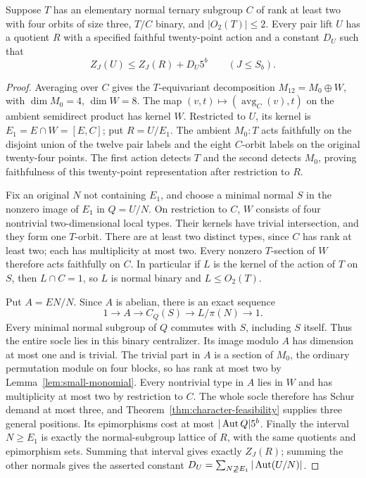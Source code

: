 \begin{lemma}\label{lem:four-triple-compression}
Suppose $T$ has an elementary normal ternary subgroup $C$ of rank at
least two with four orbits of size three, $T/C$ binary, and
$|O_2(T)|\leq2$. Every pair lift $U$ has a quotient $R$ with a
specified faithful twenty-point action and a constant $D_U$ such that
\[
 Z_J(U)\leq Z_J(R)+D_U5^b\qquad(J\leq S_b).
\]
\end{lemma}
\begin{proof}
Averaging over $C$ gives the $T$-equivariant decomposition
$M_{12}=M_0\oplus W$, with $\dim M_0=4$, $\dim W=8$.
The map $(v,t)\mapsto(\operatorname{avg}_C(v),t)$ on the ambient
semidirect product has kernel $W$. Restricted to $U$, its kernel is
$E_1=E\cap W=[E,C]$; put $R=U/E_1$. The ambient $M_0:T$ acts
faithfully on the disjoint union of the twelve pair labels and the
eight $C$-orbit labels on the original twenty-four points. The first
action detects $T$ and the second detects $M_0$, proving faithfulness
of this twenty-point representation after restriction to $R$.

Fix an original $N$ not containing $E_1$, and choose a minimal normal
$S$ in the nonzero image of $E_1$ in $Q=U/N$. On restriction to $C$,
$W$ consists of four nontrivial two-dimensional local types. Their
kernels have trivial intersection, and they form one $T$-orbit.
There are at least two distinct types, since $C$ has rank at least two;
each has multiplicity at most two. Every nonzero $T$-section of $W$
therefore acts faithfully on $C$. In particular if $L$ is the kernel
of the action of $T$ on $S$, then $L\cap C=1$, so $L$ is normal binary
and $L\leq O_2(T)$.

Put $A=EN/N$. Since $A$ is abelian, there is an exact sequence
\[
 1\longrightarrow A\longrightarrow C_Q(S)
 \longrightarrow L/\pi(N)\longrightarrow1.
\]
Every minimal normal subgroup of $Q$ commutes with $S$, including
$S$ itself. Thus the entire socle lies in this binary centralizer.
Its image modulo $A$ has dimension at most one and is trivial.
The trivial part in $A$ is a section of $M_0$, the ordinary permutation
module on four blocks, so has rank at most two by
Lemma~\ref{lem:small-monomial}. Every nontrivial type in $A$ lies in
$W$ and has multiplicity at most two by restriction to $C$.
The whole socle therefore has Schur demand at most three, and
Theorem~\ref{thm:character-feasibility} supplies three general positions.
Its epimorphisms cost at most $|\operatorname{Aut} Q|5^b$.
Finally the interval $N\geq E_1$ is exactly the normal-subgroup lattice
of $R$, with the same quotients and epimorphism sets. Summing that
interval gives exactly $Z_J(R)$; summing the other normals gives
the asserted constant $D_U=\sum_{N\not\supseteq E_1}|\operatorname{Aut}(U/N)|$.
\end{proof}

